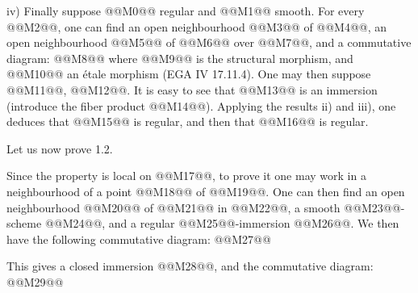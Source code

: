 iv)
Finally suppose @@M0@@ regular and @@M1@@ smooth. For every @@M2@@, one can find an open neighbourhood @@M3@@ of @@M4@@, an open neighbourhood @@M5@@ of @@M6@@ over @@M7@@, and a commutative diagram:
@@M8@@
where @@M9@@ is the structural morphism, and @@M10@@ an étale morphism (EGA IV 17.11.4). One may then suppose @@M11@@, @@M12@@. It is easy to see that @@M13@@ is an immersion (introduce the fiber product @@M14@@). Applying the results ii) and iii), one deduces that @@M15@@ is regular, and then that @@M16@@ is regular.

Let us now prove 1.2.

Since the property is local on @@M17@@, to prove it one may work in a neighbourhood of a point @@M18@@ of @@M19@@. One can then find an open neighbourhood @@M20@@ of @@M21@@ in @@M22@@, a smooth @@M23@@-scheme @@M24@@, and a regular @@M25@@-immersion @@M26@@. We then have the following commutative diagram:
@@M27@@

This gives a closed immersion @@M28@@, and the commutative diagram:
@@M29@@
